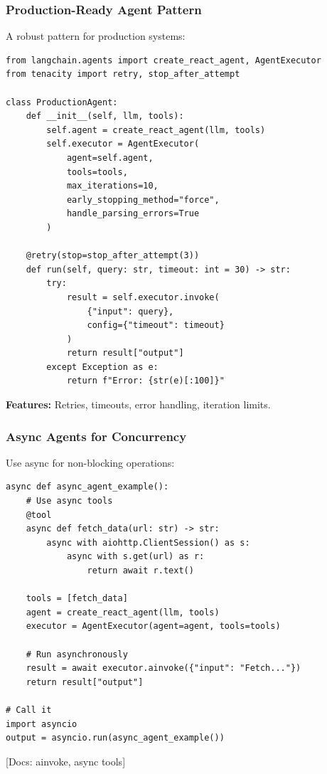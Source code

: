 \documentclass[aspectratio=169,11pt]{beamer}
\newcommand{\docref}[1]{{\scriptsize\color{docgray}[Docs: #1]}}
\begin{document}
\begin{frame}[fragile]
\frametitle{Production-Ready Agent Pattern}

A robust pattern for production systems:

\begin{lstlisting}
from langchain.agents import create_react_agent, AgentExecutor
from tenacity import retry, stop_after_attempt

class ProductionAgent:
    def __init__(self, llm, tools):
        self.agent = create_react_agent(llm, tools)
        self.executor = AgentExecutor(
            agent=self.agent,
            tools=tools,
            max_iterations=10,
            early_stopping_method="force",
            handle_parsing_errors=True
        )

    @retry(stop=stop_after_attempt(3))
    def run(self, query: str, timeout: int = 30) -> str:
        try:
            result = self.executor.invoke(
                {"input": query},
                config={"timeout": timeout}
            )
            return result["output"]
        except Exception as e:
            return f"Error: {str(e)[:100]}"
\end{lstlisting}

\textbf{Features:} Retries, timeouts, error handling, iteration limits.

\end{frame}

\begin{frame}[fragile]
\frametitle{Async Agents for Concurrency}

Use async for non-blocking operations:

\begin{lstlisting}
async def async_agent_example():
    # Use async tools
    @tool
    async def fetch_data(url: str) -> str:
        async with aiohttp.ClientSession() as s:
            async with s.get(url) as r:
                return await r.text()

    tools = [fetch_data]
    agent = create_react_agent(llm, tools)
    executor = AgentExecutor(agent=agent, tools=tools)

    # Run asynchronously
    result = await executor.ainvoke({"input": "Fetch..."})
    return result["output"]

# Call it
import asyncio
output = asyncio.run(async_agent_example())
\end{lstlisting}

\docref{ainvoke, async tools}

\end{frame}
\end{document}
